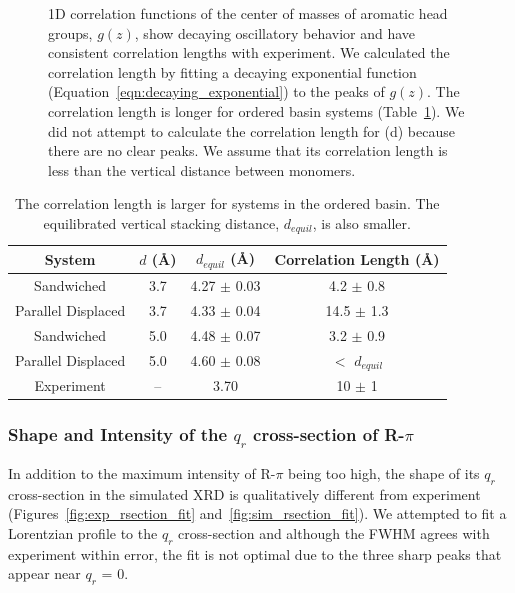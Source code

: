 \documentclass[journal=jpcbfk,manuscript=article]{achemso}
\begin{document}
\begin{figure}[!htb]
  \caption{1D correlation functions of the center of masses of aromatic head
	  groups, $g(z)$, show decaying oscillatory behavior and have consistent correlation lengths with experiment. We calculated the
	  correlation length by fitting a decaying exponential function
	  (Equation~\ref{eqn:decaying_exponential}) to the peaks of $g(z)$. The
	  correlation length is longer for ordered basin systems
	  (Table~\ref{table:correlation_length}). We did not attempt to calculate the
	  correlation length for (d) because there are no clear peaks. We assume that its
	  correlation length is less than the vertical distance between monomers.}\label{fig:correlation}
  \end{figure}  
  
  \begin{table}[h]
  \centering
  \begin{tabular}{cccc}
  \toprule
  System             & $\mathit{d}$ (\AA) & $\mathit{d}_{equil}$ (\AA) & Correlation Length (\AA) \\
  \midrule
  Sandwiched         & 3.7                &    4.27 $\pm$ 0.03         & 4.2 $\pm$ 0.8            \\
  Parallel Displaced & 3.7                &    4.33 $\pm$ 0.04         & 14.5 $\pm$ 1.3           \\ 
  Sandwiched         & 5.0                &    4.48 $\pm$ 0.07         & 3.2 $\pm$ 0.9            \\
  Parallel Displaced & 5.0                &    4.60 $\pm$ 0.08         & $<$ $d_{equil}$ \\ 
  Experiment         & --                 &    3.70                    & 10 $\pm$ 1               \\
  \bottomrule
  \end{tabular}
  \caption{The correlation length is larger for systems in the ordered basin. The equilibrated vertical
  stacking distance, $\mathit{d}_{equil}$, is also smaller.}
  \label{table:correlation_length}
  \end{table}

  \subsubsection*{Shape and Intensity of the $q_r$ cross-section of R-$\pi$}

  In addition to the maximum intensity of R-$\pi$ being too high, the shape
  of its $q_r$ cross-section in the simulated XRD is qualitatively different
  from experiment (Figures~\ref{fig:exp_rsection_fit}
  and~\ref{fig:sim_rsection_fit}). We attempted to fit a Lorentzian profile to 
  the $q_r$ cross-section and although the FWHM agrees with experiment within
  error, the fit is not optimal due to the three sharp peaks that appear near
  $q_r$ = 0. 
  
\end{document}
